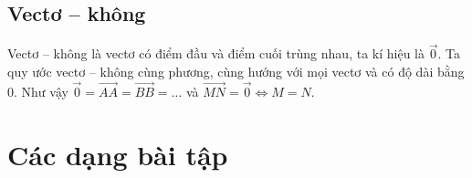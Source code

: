 \subsection{Vectơ – không}
\begin{dn}
    Vectơ – không là vectơ có điểm đầu và điểm cuối trùng nhau, ta kí hiệu là $\vec{0}$.
    Ta quy ước vectơ – không cùng phương, cùng hướng với mọi vectơ và có độ dài bằng $0$.
    Như vậy $\vec{0} = \vec{AA} = \vec{BB} = \dots$ và $\vec{MN} = \vec{0} \Leftrightarrow M = N$.
\end{dn}

\section{Các dạng bài tập}

